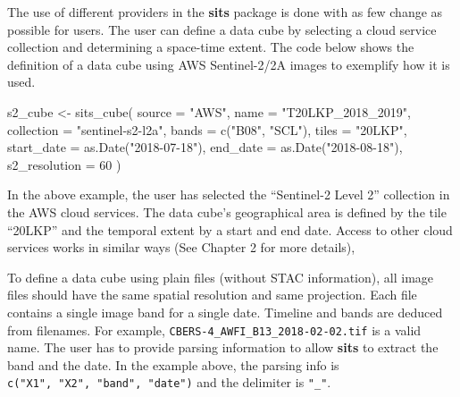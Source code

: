 \documentclass[a4paper,]{tufte-book}
\newenvironment{Shaded}{}{}
\newcommand{\AttributeTok}[1]{\textcolor[rgb]{0.49,0.56,0.16}{#1}}
\newcommand{\DecValTok}[1]{\textcolor[rgb]{0.25,0.63,0.44}{#1}}
\newcommand{\FunctionTok}[1]{\textcolor[rgb]{0.02,0.16,0.49}{#1}}
\newcommand{\NormalTok}[1]{#1}
\newcommand{\OtherTok}[1]{\textcolor[rgb]{0.00,0.44,0.13}{#1}}
\newcommand{\StringTok}[1]{\textcolor[rgb]{0.25,0.44,0.63}{#1}}
\begin{document}
The use of different providers in the \textbf{sits} package is done with as few change as possible for users. The user can define a data cube by selecting a cloud service collection and determining a space-time extent. The code below shows the definition of a data cube using AWS Sentinel-2/2A images to exemplify how it is used.

\begin{Shaded}
\begin{Highlighting}[]
\NormalTok{s2\_cube }\OtherTok{\textless{}{-}} \FunctionTok{sits\_cube}\NormalTok{(}
    \AttributeTok{source        =} \StringTok{"AWS"}\NormalTok{,}
    \AttributeTok{name          =} \StringTok{"T20LKP\_2018\_2019"}\NormalTok{,}
    \AttributeTok{collection    =} \StringTok{"sentinel{-}s2{-}l2a"}\NormalTok{,}
    \AttributeTok{bands         =} \FunctionTok{c}\NormalTok{(}\StringTok{"B08"}\NormalTok{, }\StringTok{"SCL"}\NormalTok{),}
    \AttributeTok{tiles         =} \StringTok{"20LKP"}\NormalTok{,}
    \AttributeTok{start\_date    =} \FunctionTok{as.Date}\NormalTok{(}\StringTok{"2018{-}07{-}18"}\NormalTok{),}
    \AttributeTok{end\_date      =} \FunctionTok{as.Date}\NormalTok{(}\StringTok{"2018{-}08{-}18"}\NormalTok{),}
    \AttributeTok{s2\_resolution =} \DecValTok{60}
\NormalTok{)}
\end{Highlighting}
\end{Shaded}

In the above example, the user has selected the ``Sentinel-2 Level 2'' collection in the AWS cloud services. The data cube's geographical area is defined by the tile ``20LKP'' and the temporal extent by a start and end date. Access to other cloud services works in similar ways (See Chapter 2 for more details),

To define a data cube using plain files (without STAC information), all image files should have the same spatial resolution and same projection. Each file contains a single image band for a single date. Timeline and bands are deduced from filenames. For example, \texttt{CBERS-4\_AWFI\_B13\_2018-02-02.tif} is a valid name. The user has to provide parsing information to allow \textbf{sits} to extract the band and the date. In the example above, the parsing info is \texttt{c("X1",\ "X2",\ "band",\ "date")} and the delimiter is \texttt{"\_"}.
\end{document}

